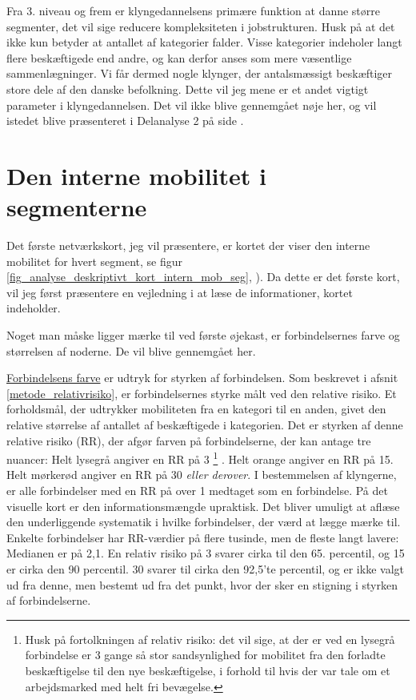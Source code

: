 Fra 3. niveau og frem er klyngedannelsens primære funktion at danne større segmenter, det vil sige reducere kompleksiteten i jobstrukturen. Husk på at det ikke kun betyder at antallet af kategorier falder. Visse kategorier indeholer langt flere beskæftigede end andre, og kan derfor anses som mere væsentlige sammenlægninger. Vi får dermed nogle klynger, der antalsmæssigt beskæftiger store dele af den danske befolkning. Dette vil jeg mene er et andet vigtigt parameter i klyngedannelsen. Det vil ikke blive gennemgået nøje her, og vil istedet blive præsenteret i Delanalyse 2 på side \pageref{kap_delanalyse2_socialeprocesser}.

\section{Den interne mobilitet i segmenterne \label{analyse_deskriptivt_within_mob_seg}}


Det første netværkskort, jeg vil præsentere, er kortet der viser den interne mobilitet for hvert segment,  se figur \ref{fig_analyse_deskriptivt_kort_intern_mob_seg}, ). %
Da dette er det første kort, vil jeg først præsentere en vejledning i at læse de informationer, kortet indeholder. 

Noget man måske ligger mærke til ved første øjekast, er forbindelsernes farve og størrelsen af noderne. De vil blive gennemgået her.

\underline{Forbindelsens farve} er udtryk for styrken af forbindelsen. Som beskrevet i afsnit \ref{metode_relativrisiko}, er forbindelsernes styrke målt ved den relative risiko. Et forholdsmål, der udtrykker mobiliteten fra en kategori til en anden, givet den relative størrelse af antallet af beskæftigede i kategorien. Det er styrken af denne relative risiko (RR), der afgør farven på forbindelserne, der kan antage tre nuancer: Helt lysegrå angiver en RR på 3%
%
\footnote{Husk på fortolkningen af relativ risiko:  det vil sige, at der er ved en lysegrå forbindelse er 3 gange så stor sandsynlighed for mobilitet fra den forladte beskæftigelse til den nye beskæftigelse, i forhold til hvis der var tale om et arbejdsmarked med helt fri bevægelse.}%
%
. Helt orange angiver en RR på 15. Helt mørkerød angiver en RR på 30 \emph{ eller derover}. I bestemmelsen af klyngerne, er alle forbindelser med en RR på over 1 medtaget som en forbindelse. På det visuelle kort er den informationsmængde upraktisk. Det bliver umuligt at aflæse den underliggende systematik i hvilke forbindelser, der værd at lægge mærke til. Enkelte forbindelser har RR-værdier på flere tusinde, men de fleste langt lavere: Medianen er på 2,1. En relativ risiko på 3 svarer cirka til den 65. percentil, og 15 er cirka den 90 percentil. 30 svarer til cirka den 92,5'te percentil, og er ikke valgt ud fra denne, men bestemt ud fra det punkt, hvor der sker en stigning i styrken af forbindelserne. 


